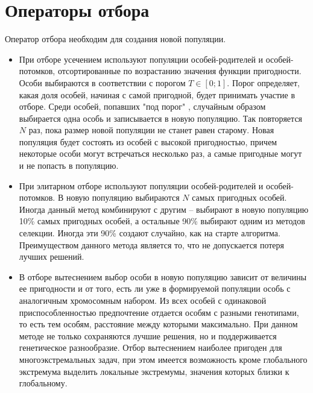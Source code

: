 \section{Операторы отбора}
Оператор отбора необходим для создания новой популяции.
\begin{itemize}[label=$\ast$]
	\item {}

При отборе усечением используют популяции особей-родителей и особей-потомков, отсортированные по возрастанию значения функции пригодности. Особи выбираются в соответствии с порогом $T \in [0;1]$. Порог определяет, какая доля особей, начиная с самой пригодной, будет принимать участие в отборе. Среди особей, попавших "под порог" , случайным образом выбирается одна особь и записывается в новую популяцию. Так повторяется $N$ раз, пока размер новой популяции не станет равен старому. Новая популяция будет состоять из особей с высокой пригодностью, причем некоторые особи могут встречаться несколько раз, а самые пригодные могут и не попасть в популяцию.
	\item {}

При элитарном отборе используют популяции особей-родителей и особей-потомков. В новую популяцию выбираются $N$ самых пригодных особей. Иногда данный метод комбинируют с другим -- выбирают в новую популяцию 10\% самых пригодных особей, а остальные 90\% выбирают одним из методов селекции. Иногда эти 90\% создают случайно, как на старте алгоритма. Преимуществом данного метода является то, что не допускается потеря лучших решений.
	\item {}

В отборе вытеснением выбор особи в новую популяцию зависит от величины ее пригодности и от того, есть ли уже в формируемой популяции особь с аналогичным хромосомным набором. Из всех особей с одинаковой приспособленностью предпочтение отдается особям с разными генотипами, то есть тем особям, расстояние между которыми максимально. При данном методе не только сохраняются лучшие решения, но и поддерживается генетическое разнообразие. Отбор вытеснением наиболее пригоден для многоэкстремальных задач, при этом имеется возможность кроме глобального экстремума выделить локальные экстремумы, значения которых близки к глобальному.
\end{itemize}

